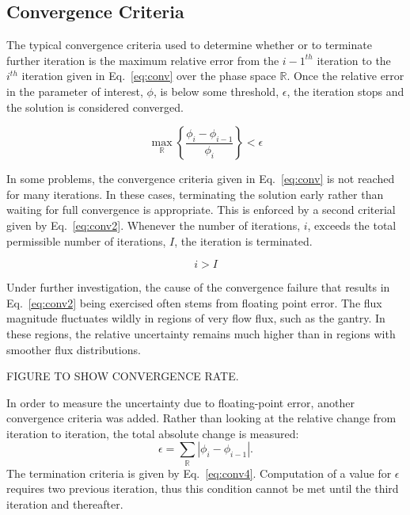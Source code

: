 \subsection{Convergence Criteria}
The typical convergence criteria used to determine whether or to terminate further iteration is the maximum relative error from the $i-1^{th}$ iteration to the $i^{th}$ iteration given in Eq.~\ref{eq:conv} over the phase space $\mathbb{R}$. Once the relative error in the parameter of interest, $\phi$, is below some threshold, $\epsilon$, the iteration stops and the solution is considered converged.

\begin{equation}\label{eq:conv}
\max_{\mathbb{R}} \left\{ \frac{\phi_i - \phi_{i-1}}{\phi_i} \right\} < \epsilon
\end{equation}

In some problems, the convergence criteria given in Eq.~\ref{eq:conv} is not reached for many iterations. In these cases, terminating the solution early rather than waiting for full convergence is appropriate. This is enforced by a second criterial given by Eq.~\ref{eq:conv2}. Whenever the number of iterations, $i$, exceeds the total permissible number of iterations, $I$, the iteration is terminated.

\begin{equation}\label{eq:conv2}
i > I
\end{equation}

Under further investigation, the cause of the convergence failure that results in Eq.~\ref{eq:conv2} being exercised often stems from floating point error. The flux magnitude fluctuates wildly in regions of very flow flux, such as the gantry. In these regions, the relative uncertainty remains much higher than in regions with smoother flux distributions. 

FIGURE TO SHOW CONVERGENCE RATE.

In order to measure the uncertainty due to floating-point error, another convergence criteria was added. Rather than looking at the relative change from iteration to iteration, the total absolute change is measured:
\begin{equation}\label{eq:conv3}
\epsilon = \sum_{\mathbb{R}} |\phi_i - \phi_{i-1}|.
\end{equation}
The termination criteria is given by Eq.~\ref{eq:conv4}. Computation of a value for $\epsilon$ requires two previous iteration, thus this condition cannot be met until the third iteration and thereafter.

